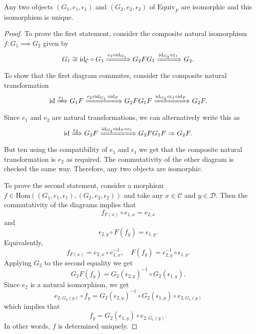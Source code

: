 \begin{proposition}
  Any two objects $ (G_1, e_1, \epsilon_1) $ and $ (G_2, e_2, \epsilon_2) $ of $ \text{Equiv}_F $ are isomorphic and this isomorphism is unique.
\end{proposition}
\begin{proof}
  To prove the first statement, consider the composite natural isomorphism $ f: G_1 \implies G_2 $ given by
  \begin{equation*}
    G_1 \cong \text{id}_\mathcal{C} \circ G_1 \xRightarrow{e_2\circ \text{id}_{G_1}} G_2FG_1 \xRightarrow{\text{id}_{G_2}\circ \epsilon_1} G_2.
  \end{equation*}
  To show that the first diagram commutes, consider the composite natural transformation
  \begin{equation*}
    \text{id} \xRightarrow{e_1} G_1F \xRightarrow{e_2 \circ \text{id}_{G_1}\,\circ \text{id}_F} G_2FG_1F \xRightarrow{\text{id}_{G_2}\circ\epsilon_1\circ \text{id}_F} G_2F
  .\end{equation*}
  Since $ e_1 $ and $ e_2 $ are natural transformations, we can alternatively write this as
  \begin{equation*}
    \text{id} \xRightarrow{e_2} G_2 F \xRightarrow{\text{id}_{G_2}\circ \text{id}_F \circ e_1} G_2FG_1F \implies G_2F
  .\end{equation*}
  But ten using the compatibility of $ e_1 $ and $ \epsilon_1 $ we get that the composite natural transformation is $ e_2 $ as required. The commutativity of the other diagram is checked the same way. Therefore, any two objects are isomorphic.

  To prove the second statement, consider a morphism $ f \in \text{Hom}((G_1, e_1, \epsilon_1), (G_2, e_2, \epsilon_2)) $ and take any $ x \in \mathcal{C} $ and $ y \in \mathcal{D} $. Then the commutativity of the diagrams implies that
  \begin{equation*}
  f_{F(x)} \circ e_{1, x} = e_{2, x}
  \end{equation*}
  and
  \begin{equation*}
  \epsilon_{2, y} \circ F(f_y) = \epsilon_{1,y}
  .\end{equation*}
  Equivalently,
  \begin{equation*}
  f_{F(x)} = e_{2, x} \circ e^{-1}_{1,x}, \quad F(f_y) = \epsilon^{-1}_{2,y}\circ \epsilon_{1,y}
  .\end{equation*}
  Applying $ G_2 $ to the second equality we get
  \begin{equation*}
  G_2F(f_y) = G_2(\epsilon_{2,y})^{-1}\circ G_2(\epsilon_{1,y})
  .\end{equation*}
  Since $ e_2 $ is a natural isomorphism, we get
  \begin{equation*}
  e_{2,G_2(y)}\circ f_y = G_2(\epsilon_{2,y})^{-1} \circ G_2(\epsilon_{1,y}) \circ e_{2, G_1(y)}
  \end{equation*}
  which implies that
  \begin{equation*}
  f_y = G_2(\epsilon_{1,y}) \circ e_{2, G_1(y)}
  .\end{equation*}
  In other words, $ f $ is determined uniquely.
\end{proof}

